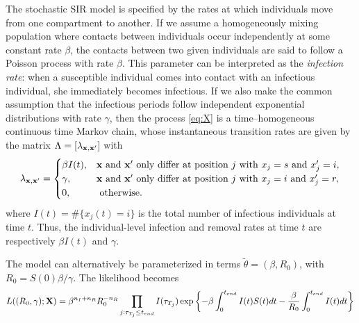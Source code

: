 \documentclass[11pt]{article}
\newcommand{\jx}[1]{{\color{blue}{ #1}}}
\begin{document}
	The stochastic SIR model is specified by the rates at which individuals move from one compartment to another. If we assume a homogeneously mixing population where contacts between individuals occur independently at some constant rate $\beta$, the contacts between two given individuals are said to follow a Poisson process with rate $\beta$. This parameter can be interpreted as the \textit{infection rate}: when a susceptible individual comes into contact with an infectious individual, she immediately becomes infectious.
	If we also make the common assumption that the infectious periods follow independent exponential distributions with rate $\gamma$, then the process \eqref{eq:X} is a time–homogeneous continuous time Markov chain, whose instantaneous transition rates
	are given by the matrix $\Lambda = [\lambda_{\mathbf{x}, \mathbf{x}'}]$ with
	\begin{equation}
	\label{eq:rate}
    	\lambda_{\mathbf{x}, \mathbf{x}'} = 
    	\begin{cases}
    		\beta I(t), & \mathbf{x} \text{ and } \mathbf{x}' \text{ only differ at position } j \text{ with } x_j = s \text{ and } x_j' = i, \\
    		\gamma, & \mathbf{x} \text{ and } \mathbf{x}' \text{ only differ at position } j \text{ with } x_j = i \text{ and } x_j' = r, \\
    		0, & \text{ otherwise.}
    	\end{cases}
	\end{equation}
	where $I(t) = \#\{x_j(t) = i\}$ is the total number of infectious individuals at time $t$. Thus, the individual-level infection and removal rates at time $t$ are respectively $\beta I(t)$ and $\gamma$.
	
	The model can alternatively be parameterized in terms $\tilde{\theta} = (\beta, R_0)$, with $R_0 = S(0)\beta/\gamma$. The likelihood becomes
	\begin{equation*}
	    L((R_0, \gamma); \mathbf{X}) = \beta^{n_I + n_R} R_0^{-n_R} \prod_{j:\tau_{T_j} \le t_{end}} I(\tau_{T_j}) \exp\left\lbrace - \beta \int_{0}^{t_{end}} I(t)S(t) dt - \frac{\beta}{R_0} \int_{0}^{t_{end}} I(t) dt \right\rbrace 
	\end{equation*}
	
	
	
\end{document}
